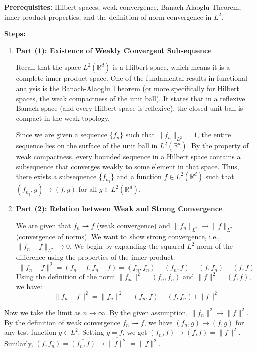\begin{solution}
\textbf{Prerequisites:} 
Hilbert spaces, weak convergence, Banach-Alaoglu Theorem, inner product properties, and the definition of norm convergence in $L^2$.

\par\vspace{\baselineskip}
\textbf{Steps:}

\begin{enumerate}
    \item \textbf{Part (1): Existence of Weakly Convergent Subsequence}

    Recall that the space $L^2(\mathbb{R}^d)$ is a Hilbert space, which means it is a complete inner product space. One of the fundamental results in functional analysis is the Banach-Alaoglu Theorem (or more specifically for Hilbert spaces, the weak compactness of the unit ball). It states that in a reflexive Banach space (and every Hilbert space is reflexive), the closed unit ball is compact in the weak topology.

    Since we are given a sequence $\{f_n\}$ such that $\|f_n\|_{L^2} = 1$, the entire sequence lies on the surface of the unit ball in $L^2(\mathbb{R}^d)$. By the property of weak compactness, every bounded sequence in a Hilbert space contains a subsequence that converges weakly to some element in that space. Thus, there exists a subsequence $\{f_{n_j}\}$ and a function $f \in L^2(\mathbb{R}^d)$ such that $(f_{n_j}, g) \to (f, g)$ for all $g \in L^2(\mathbb{R}^d)$.

    \item \textbf{Part (2): Relation between Weak and Strong Convergence}

    We are given that $f_n \rightharpoonup f$ (weak convergence) and $\|f_n\|_{L^2} \to \|f\|_{L^2}$ (convergence of norms). We want to show strong convergence, i.e., $\|f_n - f\|_{L^2} \to 0$. We begin by expanding the squared $L^2$ norm of the difference using the properties of the inner product:
    \[
    \|f_n - f\|^2 = (f_n - f, f_n - f) = (f_n, f_n) - (f_n, f) - (f, f_n) + (f, f)
    \]
    Using the definition of the norm $\|f_n\|^2 = (f_n, f_n)$ and $\|f\|^2 = (f, f)$, we have:
    \[
    \|f_n - f\|^2 = \|f_n\|^2 - (f_n, f) - (f, f_n) + \|f\|^2
    \]
\end{enumerate}

\par\vspace{\baselineskip}
Now we take the limit as $n \to \infty$. By the given assumption, $\|f_n\|^2 \to \|f\|^2$. By the definition of weak convergence $f_n \rightharpoonup f$, we have $(f_n, g) \to (f, g)$ for any test function $g \in L^2$. Setting $g = f$, we get $(f_n, f) \to (f, f) = \|f\|^2$. Similarly, $(f, f_n) = \overline{(f_n, f)} \to \overline{\|f\|^2} = \|f\|^2$.


\end{solution}
